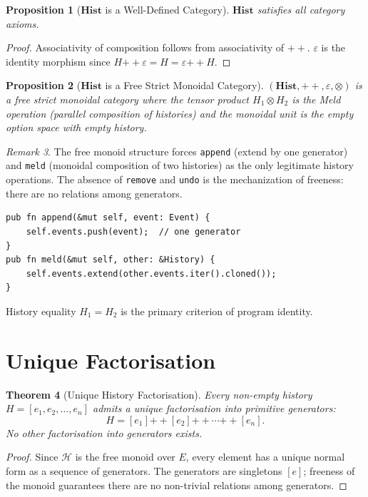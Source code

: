 \documentclass[12pt, a4paper, openany]{book}
\theoremstyle{plain}
\newtheorem{theorem}{Theorem}[chapter]
\newtheorem{proposition}[theorem]{Proposition}
\theoremstyle{definition}
\theoremstyle{remark}
\newtheorem{remark}[theorem]{Remark}
\newcommand{\Hist}{\mathbf{Hist}}
\newcommand{\calH}{\mathcal{H}}
\begin{document}
\begin{proposition}[$\Hist$ is a Well-Defined Category]
$\Hist$ satisfies all category axioms.
\end{proposition}

\begin{proof}
Associativity of composition follows from associativity of $\mathbin{++}$.
$\varepsilon$ is the identity morphism since $H \mathbin{++} \varepsilon = H =
\varepsilon \mathbin{++} H$.
\end{proof}

\begin{proposition}[$\Hist$ is a Free Strict Monoidal Category]
$(\Hist, \mathbin{++}, \varepsilon, \otimes)$ is a free strict monoidal category
where the tensor product $H_1 \otimes H_2$ is the Meld operation (parallel
composition of histories) and the monoidal unit is the empty option space with
empty history.
\end{proposition}

\begin{remark}
The free monoid structure forces \texttt{append} (extend by one generator) and
\texttt{meld} (monoidal composition of two histories) as the only legitimate
history operations. The absence of \texttt{remove} and \texttt{undo} is the
mechanization of freeness: there are no relations among generators.
\begin{lstlisting}[style=rust, caption={History as free monoid in Rust}]
pub fn append(&mut self, event: Event) {
    self.events.push(event);  // one generator
}
pub fn meld(&mut self, other: &History) {
    self.events.extend(other.events.iter().cloned());
}
\end{lstlisting}
History equality $H_1 = H_2$ is the primary criterion of program identity.
\end{remark}

\section{Unique Factorisation}

\begin{theorem}[Unique History Factorisation]
Every non-empty history $H = [e_1, e_2, \ldots, e_n]$ admits a unique
factorisation into primitive generators:
\[
H = [e_1] \mathbin{++} [e_2] \mathbin{++} \cdots \mathbin{++} [e_n].
\]
No other factorisation into generators exists.
\end{theorem}

\begin{proof}
Since $\calH$ is the free monoid over $E$, every element has a unique normal form
as a sequence of generators. The generators are singletons $[e]$; freeness of the
monoid guarantees there are no non-trivial relations among generators.
\end{proof}
\end{document}
